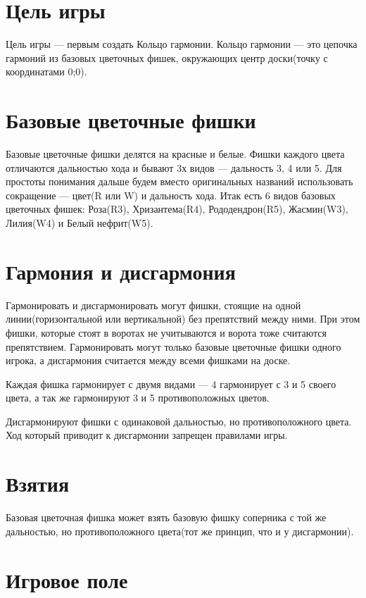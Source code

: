 \documentclass[a4paper,12pt]{diplom}
\begin{document}
\section{Цель игры}

Цель игры — первым создать Кольцо гармонии. Кольцо гармонии — это цепочка гармоний из базовых цветочных фишек, окружающих центр доски(точку с координатами 0;0).

\section{Базовые цветочные фишки}

Базовые цветочные фишки делятся на красные и белые. Фишки каждого цвета отличаются дальностью хода и бывают 3х видов — дальность 3, 4 или 5. Для простоты понимания дальше будем вместо оригинальных названий использовать сокращение — цвет(R или W) и дальность хода. Итак есть 6 видов базовых цветочных фишек: Роза(R3), Хризантема(R4), Рододендрон(R5), Жасмин(W3), Лилия(W4) и Белый нефрит(W5).

\section{Гармония и дисгармония}

Гармонировать и дисгармонировать могут фишки, стоящие на одной линии(горизонтальной или вертикальной) без препятствий между ними. При этом фишки, которые стоят в воротах не учитываются и ворота тоже считаются препятствием. Гармонировать могут только базовые цветочные фишки одного игрока, а дисгармония считается между всеми фишками на доске.

Каждая фишка гармонирует с двумя видами — 4 гармонирует с 3 и 5 своего цвета, а так же гармонируют 3 и 5 противоположных цветов.

Дисгармонируют фишки с одинаковой дальностью, но противоположного цвета. Ход который приводит к дисгармонии запрещен правилами игры.

\section{Взятия}

Базовая цветочная фишка может взять базовую фишку соперника с той же дальностью, но противоположного цвета(тот же принцип, что и у дисгармонии).

\section{Игровое поле}
\end{document}
